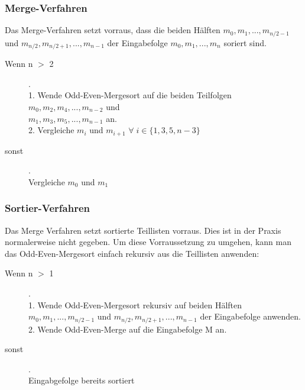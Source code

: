 \documentclass[11pt]{article}
\begin{document}
\subsubsection{Merge-Verfahren}
Das Merge-Verfahren setzt vorraus, dass die beiden Hälften $m_0, m_1, ..., m_{n/2-1}$ und $m_{n/2}, m_{n/2+1}, ..., m_{n-1}$ der Eingabefolge $m_0, m_1, ..., m_n$ soriert sind.
\begin{description}
\item[Wenn n $>$ 2] .\\1. Wende Odd-Even-Mergesort auf die beiden Teilfolgen \\$m_0, m_2, m_4, ..., m_{n-2}$ und \\$m_1, m_3, m_5, ..., m_{n-1}$ an.\\ 2. Vergleiche $m_i$ und $m_{i+1}$ $\forall \; i \in \{1, 3, 5, n-3\}$
\item[sonst].\\Vergleiche $m_0$ und $m_1$
\end{description}
\subsubsection{Sortier-Verfahren}
Das Merge Verfahren setzt sortierte Teillisten vorraus. Dies ist in der Praxis normalerweise nicht gegeben.
Um diese Vorraussetzung zu umgehen, kann man das Odd-Even-Mergesort einfach rekursiv aus die Teillisten anwenden:
\begin{description}
\item[Wenn n $>$ 1].\\1. Wende Odd-Even-Mergesort rekursiv auf beiden Hälften $m_0, m_1, ..., m_{n/2-1}$ und $m_{n/2}, m_{n/2+1}, ..., m_{n-1}$ der Eingabefolge anwenden.\\2. Wende Odd-Even-Merge auf die Eingabefolge M an.
\item[sonst].\\Eingabgefolge bereits sortiert
\end{description}
\end{document}
